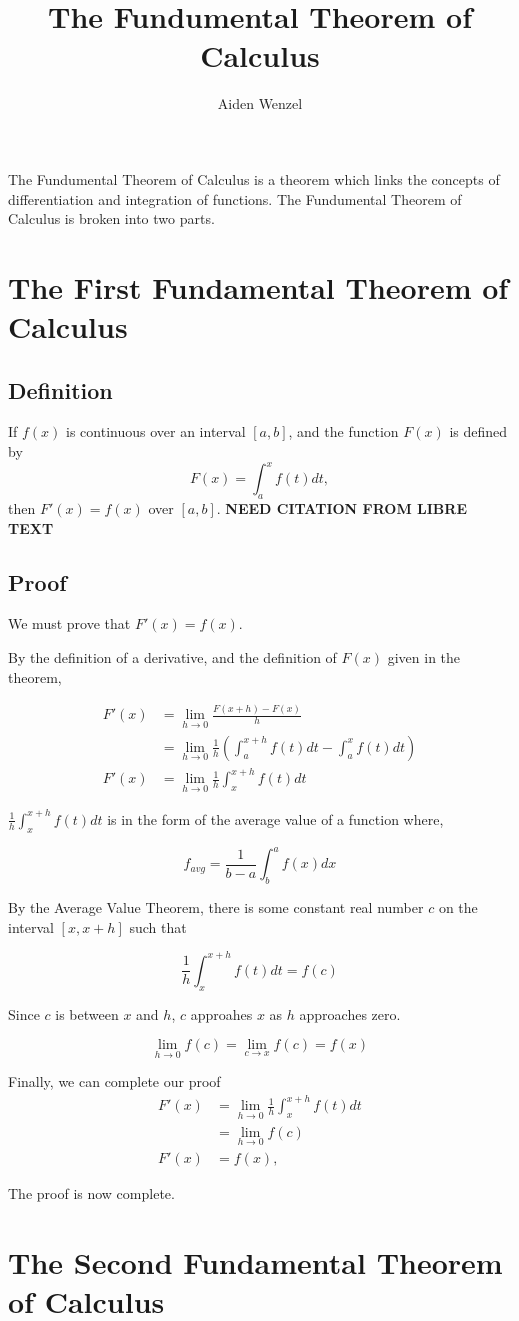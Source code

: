 \documentclass{article}
\title{The Fundumental Theorem of Calculus}
\author{Aiden Wenzel}
\begin{document}
\maketitle 

The Fundumental Theorem of Calculus is a theorem which links the concepts of differentiation and integration of functions. 
The Fundumental Theorem of Calculus is broken into two parts. 

\section{The First Fundamental Theorem of Calculus}
\subsection{Definition}
If $f(x)$ is continuous over an interval $[a,b]$, and the function $F(x)$ is defined by 
\[F(x) = \int_a^x f(t)dt,\]
then $F'(x) = f(x)$ over $[a,b]$. \textbf{NEED CITATION FROM LIBRE TEXT}

\subsection{Proof}
We must prove that \(F'(x) = f(x)\). 

By the definition of a derivative, and the definition of \(F(x)\) given in the theorem,

\begin{equation}
\begin{split}
    F'(x) &= \lim_{h \to 0}{\frac{F(x+h)-F(x)}{h}} \\
          &= \lim_{h \to 0}{\frac{1}{h} (\int_a^{x+h} f(t)dt - \int_a^x f(t)dt)} \\
    F'(x) &= \lim_{h \to 0}{\frac{1}{h} \int_x^{x+h} f(t)dt}
\end{split}
\end{equation}

\(\frac{1}{h} \int_x^{x+h} f(t)dt\) is in the form of the average value of a function where,

\[f_{avg} = \frac{1}{b-a} \int_b^a f(x)dx\]

By the Average Value Theorem, there is some constant real number $c$ on the interval \([x, x+h]\) such that

\[\frac{1}{h} \int_x^{x+h} f(t)dt = f(c)\]

Since $c$ is between $x$ and $h$, $c$ approahes $x$ as $h$ approaches zero. 

\[\lim_{h \to 0}{f(c) = \lim_{c \to x}{f(c) = f(x)}}\]

Finally, we can complete our proof
\begin{equation}
\begin{split}
    F'(x) &= \lim_{h \to 0}{\frac{1}{h} \int_x^{x+h} f(t)dt} \\
          &= \lim_{h \to 0}{f(c)} \\
    F'(x) &= f(x),
\end{split}
\end{equation}

The proof is now complete.

\section{The Second Fundamental Theorem of Calculus}
\end{document}
